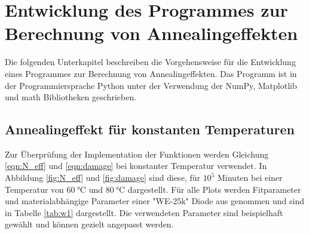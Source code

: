 \chapter{Entwicklung des Programmes zur Berechnung von Annealingeffekten}\label{make}
Die folgenden Unterkapitel beschreiben die Vorgehensweise für die Entwicklung  eines Programmes zur
Berechnung von Annealingeffekten. Das Programm ist in der Programmiersprache Python unter
der Verwendung der NumPy, Matplotlib und math Bibliotheken geschrieben.
\section{Annealingeffekt für konstanten Temperaturen}
Zur Überprüfung der Implementation der Funktionen werden
Gleichung \ref{eqn:N_eff} und \ref{eqn:damage}  bei konstanter Temperatur verwendet. In
Abbildung \ref{fig:N_eff} und \ref{fig:damage} sind diese, für $10^5$ Minuten bei einer Temperatur
von $\SI{60}{\celsius}$ und $\SI{80}{\celsius}$  dargestellt.
Für alle Plots werden Fitparameter und  materialabhängige
Parameter einer "WE-25k" Diode aus \cite{moll} genommen und sind in Tabelle \ref{tab:w1} dargestellt. Die verwendeten
Parameter sind beispielhaft gewählt und können gezielt angepasst werden.


